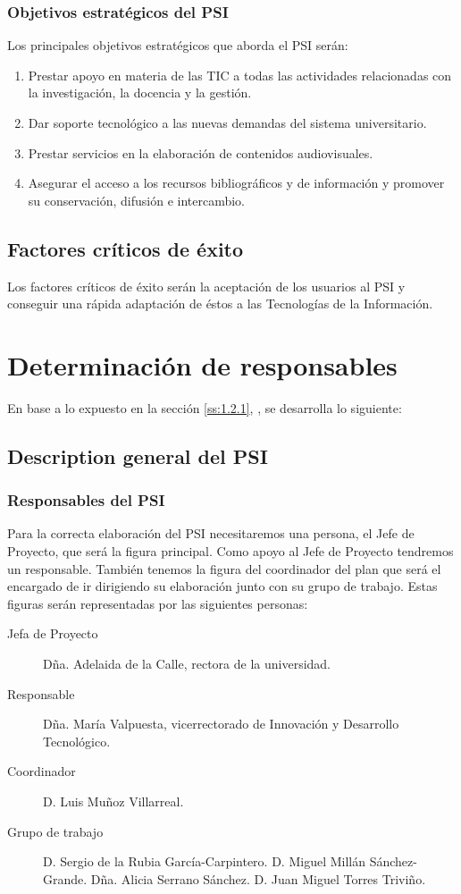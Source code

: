 \documentclass[11pt,a4paper,spanish,twoside]{book}
\begin{document}
\subsubsection{Objetivos estratégicos del PSI}
Los principales objetivos estratégicos que aborda el PSI serán:
\begin{enumerate}
\item Prestar apoyo en materia de las TIC a todas las actividades relacionadas
con la investigación, la docencia y la gestión.
\item Dar soporte tecnológico a las nuevas demandas del sistema universitario.
\item Prestar servicios en la elaboración de contenidos audiovisuales.
\item Asegurar el acceso a los recursos bibliográficos y de información y 
promover su conservación, difusión e intercambio.
\end{enumerate}

\subsection{Factores críticos de éxito}
Los factores críticos de éxito serán la aceptación de
los usuarios al PSI y conseguir una rápida adaptación de éstos a las
Tecnologías de la Información.

\section{Determinación de responsables}
En base a lo expuesto en la sección \vref{ss:1.2.1}, \emph{},
se desarrolla lo siguiente:

\subsection{Description general del PSI}\label{ss:1.3.1}
\subsubsection{Responsables del PSI}
Para la correcta elaboración del PSI necesitaremos una persona, el Jefe de 
Proyecto, que será la figura principal. Como apoyo al Jefe de Proyecto 
tendremos un responsable. También tenemos la figura del coordinador del plan 
que será el encargado de ir dirigiendo su elaboración junto con su grupo de 
trabajo. Estas figuras serán representadas por las siguientes personas:
\begin{description}
\item[Jefa de Proyecto]
Dña. Adelaida de la Calle, rectora de la universidad.
\item[Responsable]
Dña. María Valpuesta, vicerrectorado de Innovación y Desarrollo Tecnológico.
\item[Coordinador]
D. Luis Muñoz Villarreal.
\item[Grupo de trabajo]
D. Sergio de la Rubia García-Carpintero.
D. Miguel Millán Sánchez-Grande.
Dña. Alicia Serrano Sánchez.
D. Juan Miguel Torres Triviño.
\end{description}
\end{document}
